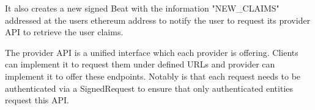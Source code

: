 It also creates a new signed Beat with the information "NEW\_CLAIMS" addressed at the users ethereum address to notify the user to request its provider API to retrieve the user claims. 

The provider API is a unified interface which each provider is offering. Clients can implement it to request them under defined URLs and provider can implement it to offer these endpoints. Notably is that each request needs to be authenticated via a SignedRequest to ensure that only authenticated entities request this API. 

